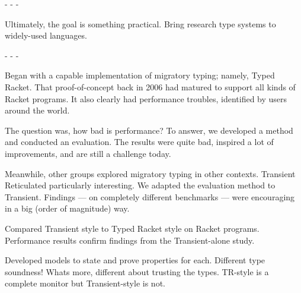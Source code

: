 %
%
%
%
%
%
%
%
%
%
%

- - -

Ultimately, the goal is something practical.
Bring research type systems to widely-used languages.

- - -

Began with a capable implementation of migratory typing; namely, Typed Racket.
That proof-of-concept back in 2006 had matured to support all kinds of Racket programs.
It also clearly had performance troubles, identified by users around the world.

The question was, how bad is performance?
To answer, we developed a method and conducted an evaluation.
The results were quite bad, inspired a lot of improvements, and are still a challenge today.

Meanwhile, other groups explored migratory typing in other contexts.
Transient Reticulated particularly interesting.
We adapted the evaluation method to Transient.
Findings --- on completely different benchmarks --- were encouraging in a big (order of magnitude) way.

Compared Transient style to Typed Racket style on Racket programs.
Performance results confirm findings from the Transient-alone study.

Developed models to state and prove properties for each.
Different type soundness!
Whats more, different about trusting the types.
TR-style is a complete monitor but Transient-style is not.


